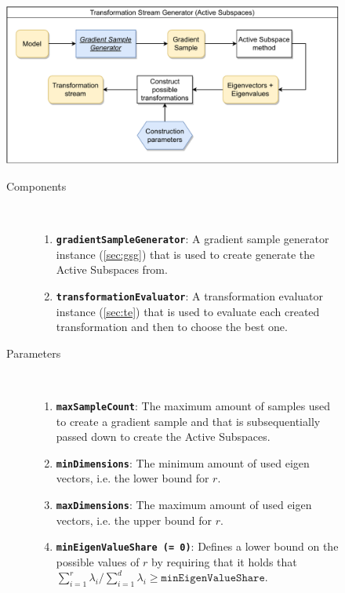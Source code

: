 \documentclass[
  a4paper,  %
  twoside,  %
  bibliography=totoc,
  headsepline,
  cleardoublepage=empty,
  parskip=half,
  draft=false
]{scrbook}
\begin{document}
\begin{figure}[H]

\includegraphics[width=\textwidth]{graphics/TransformationStreamGen_AS.pdf}

\vspace{-1.5mm}

\begin{mdframed}[linewidth=0.7px]

\begin{description}
\item[Components] {~ \begin{enumerate}[\indent{}]
\item \texttt{\textbf{gradientSampleGenerator}}: A gradient sample generator instance (\ref{sec:gsg}) that is used to create generate the Active Subspaces from.
\item \texttt{\textbf{transformationEvaluator}}: A transformation evaluator instance (\ref{sec:te}) that is used to evaluate each created transformation and then to choose the best one.
\end{enumerate}}

\item[Parameters] {~ \begin{enumerate}[\indent{}]
\item \texttt{\textbf{maxSampleCount}}: The maximum amount of samples used to create a gradient sample and that is subsequentially passed down to create the Active Subspaces.
\item \texttt{\textbf{minDimensions}}: The minimum amount of used eigen vectors, i.e. the lower bound for $r$.
\item \texttt{\textbf{maxDimensions}}: The maximum amount of used eigen vectors, i.e. the upper bound for $r$.
\item \texttt{\textbf{minEigenValueShare (= 0)}}: Defines a lower bound on the possible values of $r$ by requiring that it holds that $\sum_{i=1}^r \lambda_i / \sum_{i=1}^d \lambda_i \geq \texttt{minEigenValueShare}$.
\end{enumerate}}
\end{description}

\end{mdframed}
\label{fig:astsg}
\end{figure}
\end{document}
